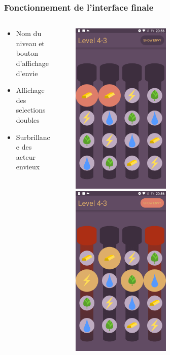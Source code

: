 \documentclass{beamer}
\begin{document}
\begin{frame}
\frametitle{Fonctionnement de l'interface finale}
\begin{columns}
\begin{column}{0.49\textwidth}
   \begin{itemize}
	\item Nom du niveau et bouton d'affichage d'envie
    \item Affichage des selections doubles  
    \item Surbrillance des acteur envieux  
\end{itemize}
\end{column}~
\begin{column}{0.49\textwidth}
    \begin{center}
     \includegraphics[width=0.49\textwidth]{g2}
     ~
     \includegraphics[width=0.49\textwidth]{g3}   
     \end{center}
\end{column}
\end{columns}
\end{frame}
\end{document}
